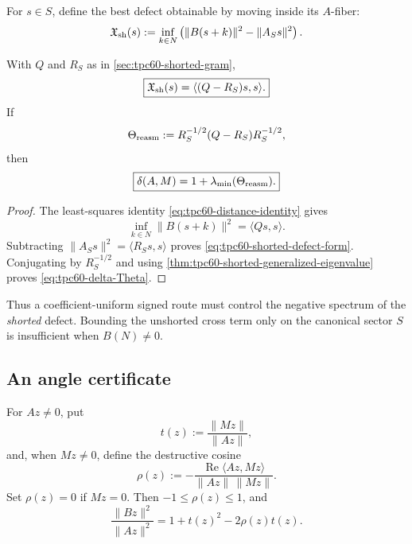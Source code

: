 For \(s\in S\), define the best defect obtainable by moving inside its
\(A\)-fiber:
\begin{equation}
 \mathfrak X_{\rm sh}(s)
 :=\inf_{k\in N}
 \left(
  \|B(s+k)\|^2-\|A_Ss\|^2
 \right).
 \label{eq:tpc60-shorted-signed-defect}
\end{equation}

\begin{proposition}
\label{prop:tpc60-shorted-defect-operator}
With \(Q\) and \(R_S\) as in
\cref{sec:tpc60-shorted-gram},
\begin{equation}
 \boxed{
 \mathfrak X_{\rm sh}(s)
 =\langle(Q-R_S)s,s\rangle.}
 \label{eq:tpc60-shorted-defect-form}
\end{equation}
If
\begin{equation}
 \Theta_{\rm reasm}
 :=R_S^{-1/2}(Q-R_S)R_S^{-1/2},
 \label{eq:tpc60-Theta-reassembly}
\end{equation}
then
\begin{equation}
 \boxed{
 \delta(A,M)
 =1+\lambda_{\min}(\Theta_{\rm reasm}).}
 \label{eq:tpc60-delta-Theta}
\end{equation}
\end{proposition}

\begin{proof}
The least-squares identity
\eqref{eq:tpc60-distance-identity} gives
\[
 \inf_{k\in N}\|B(s+k)\|^2
 =\langle Qs,s\rangle.
\]
Subtracting \(\|A_Ss\|^2=\langle R_Ss,s\rangle\) proves
\eqref{eq:tpc60-shorted-defect-form}.  Conjugating by \(R_S^{-1/2}\) and
using \cref{thm:tpc60-shorted-generalized-eigenvalue} proves
\eqref{eq:tpc60-delta-Theta}.
\end{proof}

Thus a coefficient-uniform signed route must control the negative spectrum
of the \emph{shorted} defect.  Bounding the unshorted cross term only on the
canonical sector \(S\) is insufficient when \(B(N)\ne0\).

\subsection{An angle certificate}

For \(Az\ne0\), put
\begin{equation}
 t(z):=\frac{\|Mz\|}{\|Az\|},
 \label{eq:tpc60-size-ratio-t}
\end{equation}
and, when \(Mz\ne0\), define the destructive cosine
\begin{equation}
 \rho(z)
 :=-\frac{\operatorname{Re}\langle Az,Mz\rangle}
          {\|Az\|\,\|Mz\|}.
 \label{eq:tpc60-destructive-cosine}
\end{equation}
Set \(\rho(z)=0\) if \(Mz=0\).  Then \(-1\le\rho(z)\le1\), and
\begin{equation}
 \frac{\|Bz\|^2}{\|Az\|^2}
 =1+t(z)^2-2\rho(z)t(z).
 \label{eq:tpc60-angle-size-identity}
\end{equation}

